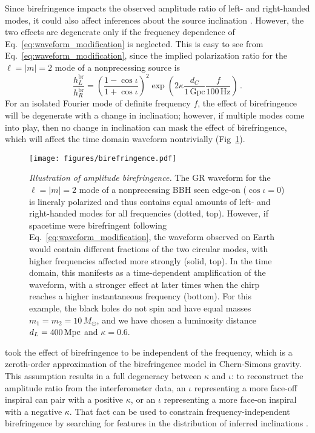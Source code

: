 \documentclass[aps,prd,twocolumn,superscriptaddress,preprintnumbers,floatfix,nofootinbib]{revtex4-2}
\begin{document}
Since birefringence impacts the observed amplitude ratio of left- and right-handed modes, it could also affect inferences about the source inclination \cite{Alexander:2009tp}.
However, the two effects are degenerate only if the frequency dependence of Eq.~\eqref{eq:waveform_modification} is neglected.
This is easy to see from Eq.~\eqref{eq:waveform_modification}, since the implied polarization ratio for the $\ell = |m| = 2$ mode of a nonprecessing source is
\begin{equation}
    \frac{h_{L}^\mathrm{br}}{h_{R}^\mathrm{br}}=\left(\frac{1-\cos\iota}{1+\cos\iota}\right)^2
    \exp\left({2\kappa\frac{d_C}{1\, \mathrm{Gpc}}\frac{f}{100\, \mathrm{Hz}}}\right)\, .
    \label{eq:modified_amplitude_ratio}
\end{equation}
For an isolated Fourier mode of definite frequency $f$, the effect of birefringence will be degenerate with a change in inclination; however, if multiple modes come into play, then no change in inclination can mask the effect of birefringence, which will affect the time domain waveform nontrivially (Fig~\ref{fig:birefringence}).

\begin{figure}
    \texttt{[image: figures/birefringence.pdf]}
    \caption{
        \emph{Illustration of amplitude birefringence.} The GR waveform for the $\ell=|m|=2$ mode of a nonprecessing BBH seen edge-on ($\cos\iota = 0$) is lineraly polarized and thus contains equal amounts of left- and right-handed modes for all frequencies (dotted, top).
        However, if spacetime were birefringent following Eq.~\protect\eqref{eq:waveform_modification}, the waveform observed on Earth would contain different fractions of the two circular modes, with higher frequencies affected more strongly (solid, top). 
        In the time domain, this manifests as a time-dependent amplification of the waveform, with a stronger effect at later times when the chirp reaches a higher instantaneous frequency (bottom).
        For this example, the black holes do not spin and have equal masses $m_1 = m_2 = 10\, M_\odot$, and we have chosen a luminosity distance $d_L = 400\, {\rm Mpc}$ and $\kappa = 0.6$.
        }
    \label{fig:birefringence}
\end{figure}

\citet{Okounkova_2022} took the effect of birefringence to be independent of the frequency, which is a zeroth-order approximation of the birefringence model in Chern-Simons gravity.
This assumption results in a full degeneracy between $\kappa$ and $\iota$:
to reconstruct the amplitude ratio from the interferometer data, an $\iota$ representing a more face-off inspiral can pair with a positive $\kappa$, or an $\iota$ representing a more face-on inspiral with a negative $\kappa$.
That fact can be used to constrain frequency-independent birefringence by searching for features in the distribution of inferred inclinations \cite{Okounkova_2022}.
\end{document}
